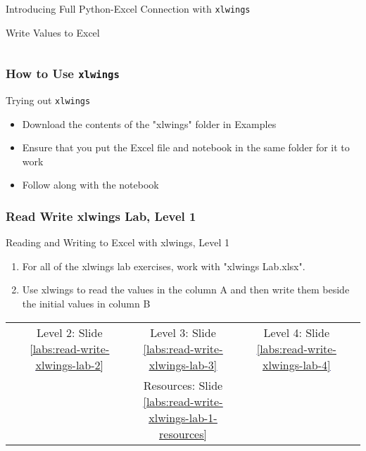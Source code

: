 \documentclass[handout, 11pt]{beamer}
\begin{document}
\begin{section}{Introducing Full Python-Excel Connection with \texttt{xlwings}}
\begin{frame}[fragile]
\begin{block}{Write Values to Excel}
\begin{verbatim}
\end{verbatim}
\end{block}
\end{frame}
\begin{frame}
\frametitle{How to Use \texttt{xlwings}}
{
\begin{block}{Trying out \texttt{xlwings}}
\begin{itemize}
\item Download the contents of the "xlwings" folder in Examples
\item Ensure that you put the Excel file and notebook in the same folder for it to work
\item Follow along with the notebook
\end{itemize}
\end{block}
}
\end{frame}
\begin{frame}
\frametitle{Read Write xlwings Lab, Level 1}
{
\begin{block}{Reading and Writing to Excel with xlwings, Level 1}
\begin{enumerate}
\item For all of the xlwings lab exercises, work with "xlwings Lab.xlsx".
\item Use xlwings to read the values in the column A and then write them beside
the initial values in column B
\end{enumerate}
\vfill
\begin{tabular*}{\textwidth}{@{\extracolsep{\fill}}ccccc}
\toprule
\hfill & Level 2: Slide \textcolor{blue}{\underline{\ref{labs:read-write-xlwings-lab-2}}} & Level 3: Slide \textcolor{blue}{\underline{\ref{labs:read-write-xlwings-lab-3}}} & Level 4: Slide \textcolor{blue}{\underline{\ref{labs:read-write-xlwings-lab-4}}} & \hfill\\
\hfill &  & Resources: Slide \textcolor{blue}{\underline{\ref{labs:read-write-xlwings-lab-1-resources}}} &  & \hfill\\

\end{tabular*}
\end{block}
}
\label{labs:read-write-xlwings-lab-1}
\end{frame}
\end{section}
\appendix
{}
\setcounter{finalframe}{\value{framenumber}}
\end{document}
